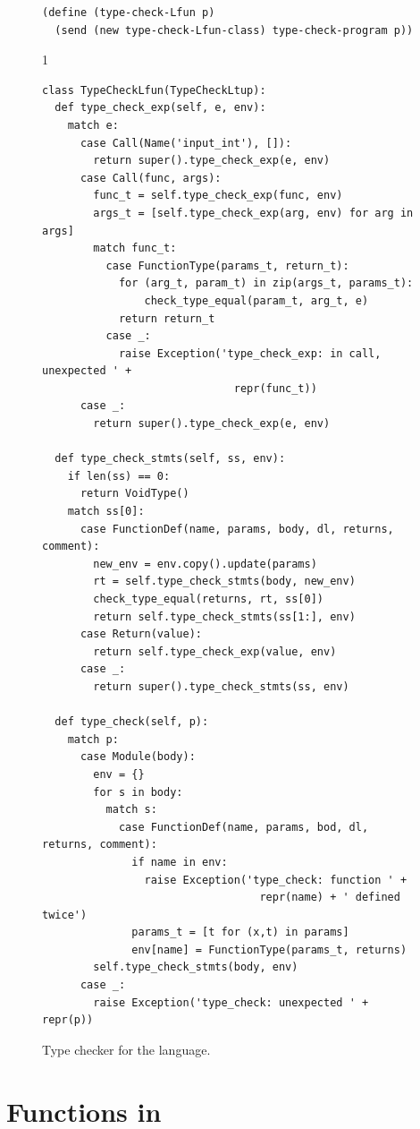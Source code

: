 \documentclass[7x10]{TimesAPriori_MIT}%
\def\pythonEd{1}
\def\edition{1}
\newcommand{\pythonColor}[0]{}
\numberwithin{theorem}{chapter}
\numberwithin{definition}{chapter}
\numberwithin{equation}{chapter}
\begin{document}
\begin{figure}[tp]
\begin{tcolorbox}[colback=white]
{\begin{lstlisting}[basicstyle=\ttfamily\footnotesize]
(define (type-check-Lfun p)
  (send (new type-check-Lfun-class) type-check-program p))
\end{lstlisting}
\fi}
{\if\edition\pythonEd\pythonColor
\begin{lstlisting}  
class TypeCheckLfun(TypeCheckLtup):
  def type_check_exp(self, e, env):
    match e:
      case Call(Name('input_int'), []):
        return super().type_check_exp(e, env)      
      case Call(func, args):
        func_t = self.type_check_exp(func, env)
        args_t = [self.type_check_exp(arg, env) for arg in args]
        match func_t:
          case FunctionType(params_t, return_t):
            for (arg_t, param_t) in zip(args_t, params_t):
                check_type_equal(param_t, arg_t, e)
            return return_t
          case _:
            raise Exception('type_check_exp: in call, unexpected ' +
                              repr(func_t))
      case _:
        return super().type_check_exp(e, env)

  def type_check_stmts(self, ss, env):
    if len(ss) == 0:
      return VoidType()
    match ss[0]:
      case FunctionDef(name, params, body, dl, returns, comment):
        new_env = env.copy().update(params)
        rt = self.type_check_stmts(body, new_env)
        check_type_equal(returns, rt, ss[0])
        return self.type_check_stmts(ss[1:], env)
      case Return(value):
        return self.type_check_exp(value, env)
      case _:
        return super().type_check_stmts(ss, env)

  def type_check(self, p):
    match p:
      case Module(body):
        env = {}
        for s in body:
          match s:
            case FunctionDef(name, params, bod, dl, returns, comment):
              if name in env:
                raise Exception('type_check: function ' +
                                  repr(name) + ' defined twice')
              params_t = [t for (x,t) in params]
              env[name] = FunctionType(params_t, returns)
        self.type_check_stmts(body, env)
      case _:
        raise Exception('type_check: unexpected ' + repr(p))
\end{lstlisting}
\fi}
  \end{tcolorbox}

  \caption{Type checker for the \LangFun{} language.}
\label{fig:type-check-Lfun}
\end{figure}


\clearpage

\section{Functions in \ArchName}
\label{sec:fun-x86}
\end{document}

